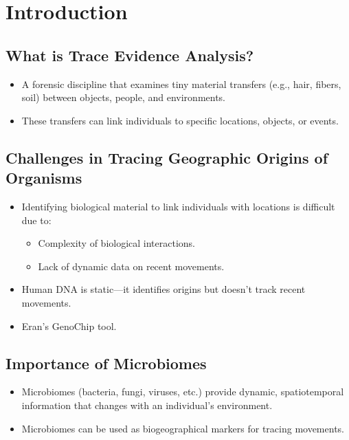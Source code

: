 \section{Introduction}
\subsection{What is Trace Evidence Analysis?}
\begin{itemize}
    \item A forensic discipline that examines tiny material transfers (e.g., hair, fibers, soil) between objects, people, and environments.
    \item These transfers can link individuals to specific locations, objects, or events.
\end{itemize}

\subsection{Challenges in Tracing Geographic Origins of Organisms}
\begin{itemize}
    \item Identifying biological material to link individuals with locations is difficult due to:
    \begin{itemize}
        \item Complexity of biological interactions.
        \item Lack of dynamic data on recent movements.
    \end{itemize}
    \item Human DNA is static—it identifies origins but doesn't track recent movements.
    \item Eran’s GenoChip tool.
\end{itemize}

\subsection{Importance of Microbiomes}
\begin{itemize}
    \item Microbiomes (bacteria, fungi, viruses, etc.) provide dynamic, spatiotemporal information that changes with an individual’s environment.
    \item Microbiomes can be used as biogeographical markers for tracing movements.
\end{itemize}

